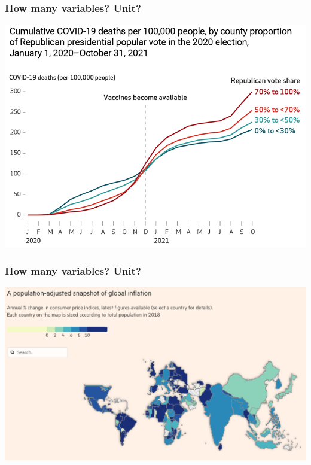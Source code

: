 \documentclass[aspectratio=43]{beamer}
\begin{document}
\begin{frame}
\frametitle{How many variables? Unit?}
\centering

\includegraphics[width = \textwidth]{../img/covid_vote}

\end{frame}

\begin{frame}
\frametitle{How many variables? Unit?}
\centering

\includegraphics[width = \textwidth]{../img/global_inflation_ft}

\end{frame}
\end{document}
